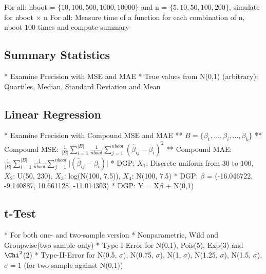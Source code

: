 
For all: nboot = $\{10, 100, 500, 1000, 10000\}$ and n = $\{5, 10, 50, 100, 200\}$, simulate for nboot $\times$ n
For all: Measure time of a function for each combination of n, nboot $100$ times and compute summary

\subsection{Summary Statistics}
* Examine Precision with MSE and MAE
* True values from N(0,1) (arbitrary): Quartiles, Median, Standard Deviation and Mean

\subsection{Linear Regression}

* Examine Precision with Compound MSE and MAE
** $ B  = \{\beta_1, ..., \beta_i, ..., \beta_k\}$
** Compound MSE: $\frac{1}{\lvert B \rvert} \sum_{i = 1}^{\lvert B \rvert} \frac{1}{nboot} \sum_{j = 1}^{nboot} (\hat{\beta}_{ij} - \beta_i)^2$
** Compound MAE: $\frac{1}{\lvert B \rvert} \sum_{i = 1}^{\lvert B \rvert} \frac{1}{nboot} \sum_{j = 1}^{nboot} \lvert (\hat{\beta}_{ij} - \beta_i) \rvert $
* DGP: $X_1$: Discrete uniform from $30$ to $100$, $X_2$: U(50, 230), $X_3$: log(N(100, 7.5)), $X_4$: N(100, 7.5)
* DGP: $\beta$ = (-16.046722, -9.140887, 10.661128, -11.014303)
* DGP: Y = X$\beta$ + N(0,1)

\subsection{t-Test}
* For both one- and two-sample version
* Nonparametric, Wild and Groupwise(two sample only)
* Type-I-Error for N(0,1), Pois(5), Exp(3) and $\Chi^2$(2)
* Type-II-Error for N(0.5, $\sigma$), N(0.75, $\sigma$), N(1, $\sigma$), N(1.25, $\sigma$), N(1.5, $\sigma$), $\sigma = 1$ (for two sample against N(0,1))